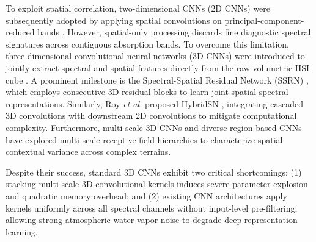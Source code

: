 \documentclass[manuscript,screen,review]{acmart}
\begin{document}
To exploit spatial correlation, two-dimensional CNNs (2D CNNs) were subsequently adopted by applying spatial convolutions on principal-component-reduced bands \cite{zhao2016spectral}. However, spatial-only processing discards fine diagnostic spectral signatures across contiguous absorption bands. To overcome this limitation, three-dimensional convolutional neural networks (3D CNNs) were introduced to jointly extract spectral and spatial features directly from the raw volumetric HSI cube \cite{ben2018deep}. A prominent milestone is the Spectral-Spatial Residual Network (SSRN) \cite{zhong2017spectral}, which employs consecutive 3D residual blocks to learn joint spatial-spectral representations. Similarly, Roy \textit{et al.} proposed HybridSN \cite{roy2020hybridsn}, integrating cascaded 3D convolutions with downstream 2D convolutions to mitigate computational complexity. Furthermore, multi-scale 3D CNNs \cite{he2018multi} and diverse region-based CNNs \cite{zhang2018diverse} have explored multi-scale receptive field hierarchies to characterize spatial contextual variance across complex terrains.

Despite their success, standard 3D CNNs exhibit two critical shortcomings: (1) stacking multi-scale 3D convolutional kernels induces severe parameter explosion and quadratic memory overhead; and (2) existing CNN architectures apply kernels uniformly across all spectral channels without input-level pre-filtering, allowing strong atmospheric water-vapor noise to degrade deep representation learning.
\end{document}
